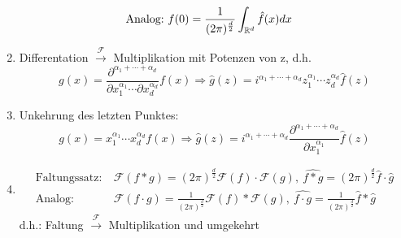 \begin{enumerate}[-]
\begin{align*}
            \text{Analog:} \ & \displaystyle f(0) = \frac{1}{(2 \pi )^\frac{d}{2}} \int_{\mathbb{R}^d} \hat f(x) dx
        \end{align*}
        \item Differentation $\overset{\mathcal F}{\to}$ Multiplikation mit Potenzen von z, d.h.
        \begin{equation*}
            g(x) = \frac{\partial^{\alpha_1 + \cdots + \alpha_d}}{\partial x_1^{\alpha_1} \cdots \partial x_d^{\alpha_d}} f(x) \Rightarrow \hat g(z) = i^{\alpha_1 + \cdots + \alpha_d} z_1^{\alpha_1} \cdots z_d^{\alpha_d} \hat f(z)
        \end{equation*}
        \item Unkehrung des letzten Punktes:
        \begin{equation*}
            g(x) = x_1^{\alpha_1} \cdots x_d^{\alpha_d} f(x) \Rightarrow \hat g(z) = i^{\alpha_1 + \cdots + \alpha_d}  \frac{\partial^{\alpha_1 + \cdots + \alpha_d}}{\partial x_1^{\alpha_1}} \hat f(z)
        \end{equation*}
        \item
        \begin{align*}
            \text{Faltungssatz:} \  & \mathcal F(f*g) = (2 \pi)^{\frac{d}{2}} \mathcal F(f) \cdot \mathcal F(g), \ \widehat{f*g}=(2 \pi)^{\frac{d}{2}} \hat f \cdot \hat g\\
            \text{Analog:} \ & \mathcal F (f \cdot g) = \frac{1}{(2 \pi)^{\frac{d}{2}}} \mathcal F(f) * \mathcal F(g), \ \widehat{f \cdot g} = \frac{1}{(2\pi)^{\frac{d}{2}}} \hat f * \hat g
        \end{align*}
        d.h.: Faltung $\overset{\mathcal F}{\to}$ Multiplikation und umgekehrt
    \end{enumerate}


